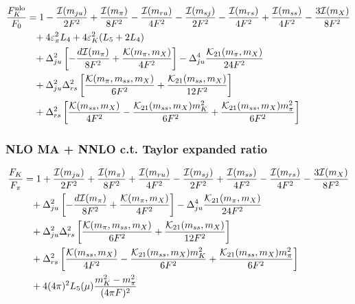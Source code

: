 \documentclass[prd,11pt,tightenlines,preprintnumbers,showpacs,superscriptaddress,notitlepage,nofootinbib,eqsecnum,floatfix,longbibliography]{revtex4-1}
\begin{document}
\begin{align}
\frac{F_K^{\rm nlo}}{F_0} &= 1
	-\frac{{\mathcal I}(m_{ju})}{2F^2}
	+\frac{{\mathcal I}(m_\pi)}{8F^2}
	-\frac{{\mathcal I}(m_{ru})}{4F^2}
	-\frac{{\mathcal I}(m_{sj})}{2F^2}
	-\frac{{\mathcal I}(m_{rs})}{4F^2}
	+\frac{{\mathcal I}(m_{ss})}{4F^2}
	-\frac{3{\mathcal I}(m_X)}{8F^2}
\nonumber\\&\phantom{=}
	+4{\varepsilon}_\pi^2 L_4 + 4{\varepsilon}_K^2(L_5 + 2L_4)
\nonumber\\&\phantom{=}
	+{\Delta}_{ju}^2 \left[ -\frac{d{\mathcal I}(m_\pi)}{8F^2} + \frac{{\mathcal K(}m_\pi,m_X)}{4F^2} \right]
	-{\Delta}_{ju}^4 \frac{{\mathcal K}_{21}(m_\pi,m_X)}{24 F^2}
\nonumber\\&\phantom{=}
	+{\Delta}_{ju}^2{\Delta}_{rs}^2 \left[ \frac{{\mathcal K}(m_\pi, m_{ss}, m_X)}{6F^2}
		+\frac{{\mathcal K}_{21}(m_{ss},m_X)}{12F^2} \right]
\nonumber\\&\phantom{=}
	+{\Delta}_{rs}^2 \left[
		\frac{{\mathcal K}(m_{ss},m_X)}{4F^2} 
		-\frac{{\mathcal K}_{21}(m_{ss},m_X) m_K^2}{6F^2}
		+\frac{{\mathcal K}_{21}(m_{ss},m_X) m_\pi^2}{6F^2}
		\right]
\end{align}


\subsubsection{NLO MA + NNLO c.t. Taylor expanded ratio}
\begin{align}\label{eq:fkfpi_ma}
\frac{F_K}{F_\pi} &= 1
	+\frac{{\mathcal I(m_{ju})}}{2F^2}
	+\frac{{\mathcal I}(m_\pi)}{8F^2}
	+\frac{{\mathcal I}(m_{ru})}{4F^2}
	-\frac{{\mathcal I}(m_{sj})}{2F^2}
	+\frac{{\mathcal I}(m_{ss})}{4F^2}
	-\frac{{\mathcal I}(m_{rs})}{4F^2}
	-\frac{3{\mathcal I}(m_X)}{8F^2}
\nonumber\\&\phantom{=}
	+{\Delta}_{ju}^2 \left[ -\frac{d{\mathcal I}(m_\pi)}{8F^2} + \frac{{\mathcal K(}m_\pi,m_X)}{4F^2} \right]
	-{\Delta}_{ju}^4 \frac{{\mathcal K}_{21}(m_\pi,m_X)}{24 F^2}
\nonumber\\&\phantom{=}
	+{\Delta}_{ju}^2{\Delta}_{rs}^2 \left[ \frac{{\mathcal K}(m_\pi, m_{ss}, m_X)}{6F^2}
		+\frac{{\mathcal K}_{21}(m_{ss},m_X)}{12F^2} \right]
\nonumber\\&\phantom{=}
	+{\Delta}_{rs}^2 \left[
		\frac{{\mathcal K}(m_{ss},m_X)}{4F^2} 
		-\frac{{\mathcal K}_{21}(m_{ss},m_X) m_K^2}{6F^2}
		+\frac{{\mathcal K}_{21}(m_{ss},m_X) m_\pi^2}{6F^2}
		\right]
\nonumber\\&\phantom{=}
	+ 4 (4\pi)^2 L_5(\mu) \frac{m_K^2 - m_\pi^2}{(4\pi F)^2}
\end{align}
\end{document}
